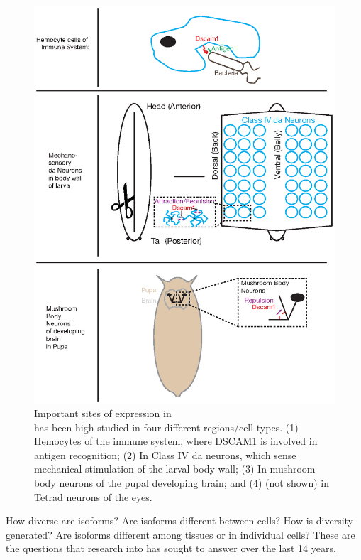     \begin{figure} %
      \centering 
      \includegraphics{Figures/Intro/DscamAnatomy.eps}
      \caption[Important sites of \dscam{} expression in \flies{}]
      {
        Important sites of \dscam{} expression in \flies{} \\[0.25cm]
        \dscam{} has been high-studied in four different regions/cell types. (1) Hemocytes of the immune system, where DSCAM1 is involved in antigen recognition; (2) In Class IV da neurons, which sense mechanical stimulation of the larval body wall; (3) In mushroom body neurons of the pupal developing brain; and (4) (not shown) in Tetrad neurons of the eyes.
        }
      \label{Intro:fig:DscamAnatomy}
      \end{figure}

    How diverse are \dscam{} isoforms? Are isoforms different between cells? How is diversity generated? Are isoforms different among tissues or in individual cells? These are the questions that research into \dscam{} has sought to answer over the last 14 years.

